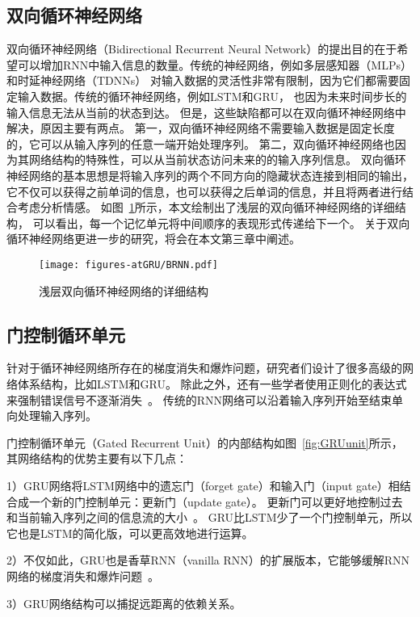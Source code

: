 \subsection{双向循环神经网络}
双向循环神经网络（Bidirectional Recurrent Neural Network）的提出目的在于希望可以增加RNN中输入信息的数量。传统的神经网络，例如多层感知器（MLPs）和时延神经网络（TDNNs）
对输入数据的灵活性非常有限制，因为它们都需要固定输入数据。传统的循环神经网络，例如LSTM和GRU，
也因为未来时间步长的输入信息无法从当前的状态到达。
但是，这些缺陷都可以在双向循环神经网络中解决，原因主要有两点。
第一，双向循环神经网络不需要输入数据是固定长度的，它可以从输入序列的任意一端开始处理序列。
第二，双向循环神经网络也因为其网络结构的特殊性，可以从当前状态访问未来的的输入序列信息。
双向循环神经网络的基本思想是将输入序列的两个不同方向的隐藏状态连接到相同的输出，
它不仅可以获得之前单词的信息，也可以获得之后单词的信息，并且将两者进行结合考虑分析情感。
如图~\ref{fig:brnn}所示，本文绘制出了浅层的双向循环神经网络的详细结构，
可以看出，每一个记忆单元将中间顺序的表现形式传递给下一个。
关于双向循环神经网络更进一步的研究，将会在本文第三章中阐述。

\begin{figure}[h!]
    \centering
    \texttt{[image: figures-atGRU/BRNN.pdf]}
    \caption{浅层双向循环神经网络的详细结构}
    \label{fig:brnn}
\end{figure}

\subsection{门控制循环单元}
针对于循环神经网络所存在的梯度消失和爆炸问题，研究者们设计了很多高级的网络体系结构，比如LSTM和GRU。
除此之外，还有一些学者使用正则化的表达式来强制错误信号不逐渐消失~。
传统的RNN网络可以沿着输入序列开始至结束单向处理输入序列。

门控制循环单元（Gated Recurrent Unit）的内部结构如图~\ref{fig:GRUunit}所示，其网络结构的优势主要有以下几点：

1）GRU网络将LSTM网络中的遗忘门（forget gate）和输入门（input gate）相结合成一个新的门控制单元：更新门（update gate）。
更新门可以更好地控制过去和当前输入序列之间的信息流的大小~。
GRU比LSTM少了一个门控制单元，所以它也是LSTM的简化版，可以更高效地进行运算。

2）不仅如此，GRU也是香草RNN（vanilla RNN）的扩展版本，它能够缓解RNN网络的梯度消失和爆炸问题~。

3）GRU网络结构可以捕捉远距离的依赖关系。

